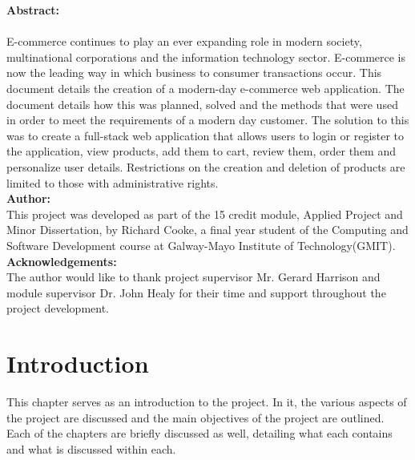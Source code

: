 
{\noindent\Large\textbf {Abstract:}} \\  \\ E-commerce continues to play an ever expanding role in modern society, multinational corporations and the information technology sector. E-commerce is now the leading way in which business to consumer transactions occur. This document details the creation of a modern-day e-commerce web application. The document details how this was planned, solved and the methods that were used in order to meet the requirements of a modern day customer. The solution to this was to create a full-stack web application that allows users to login or register to the application, view products, add them to cart, review them, order them and personalize user details. Restrictions on the creation and deletion of products are limited to those with administrative rights. \\ 

{\noindent\Large\textbf {Author:}} \\  This project was developed as part of the 15 credit module, Applied Project and Minor Dissertation, by Richard Cooke, a final year student of the Computing and Software Development course at Galway-Mayo Institute of Technology(GMIT).\\

{\noindent\Large\textbf {Acknowledgements:}} \\ The author would like to thank project supervisor Mr. Gerard Harrison and module supervisor Dr. John Healy for their time and support throughout the project development. 


\chapter{Introduction}
This chapter serves as an introduction to the project. In it, the various aspects
of the project are discussed and the main objectives of the project are outlined. Each of the 
chapters are briefly discussed as well, detailing what each contains and what is
discussed within each. \\ \\

